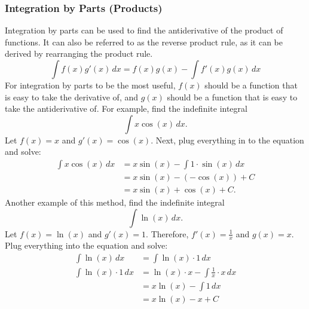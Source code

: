 \documentclass[12pt]{article}
\begin{document}
            \subsubsection{Integration by Parts (Products)}
                Integration by parts can be used to find the antiderivative of the product of functions. It can also be referred to as the reverse product rule, as it can be derived by rearranging the product rule.
                \[ \int f(x) g'(x) \, dx = f(x) g(x) - \int f'(x) g(x) \, dx \]
                For integration by parts to be the most useful, $f(x)$ should be a function that is easy to take the derivative of, and $g(x)$ should be a function that is easy to take the antiderivative of.
                \newline \newline
                For example, find the indefinite integral
                \[ \int x \cos(x) \, dx. \]
                Let $f(x) = x$ and $g'(x) = \cos(x)$. Next, plug everything in to the equation and solve:
                \begin{align*}
                    \int x \cos(x) \, dx &= x \sin(x) - \int 1 \cdot \sin(x) \, dx \\
                    &= x \sin(x) - \left( -\cos(x) \right) + C \\
                    &= x\sin(x) + \cos(x) + C.
                \end{align*}
                \newline
                Another example of this method, find the indefinite integral
                \[ \int \ln(x) \, dx. \]
                Let $f(x) = \ln(x)$ and $g'(x) = 1$. Therefore, $f'(x) = \frac{1}{x}$ and $g(x) = x$. Plug everything into the equation and solve:
                \begin{align*}
                    \int \ln(x) \, dx &= \int \ln(x) \cdot 1 \, dx \\
                    \int \ln(x) \cdot 1 \, dx &= \ln(x) \cdot x - \int \frac{1}{x} \cdot x \, dx \\[6pt]
                    &= x \ln(x) - \int 1 \, dx \\
                    &= x \ln(x) - x + C
                \end{align*}
\end{document}
